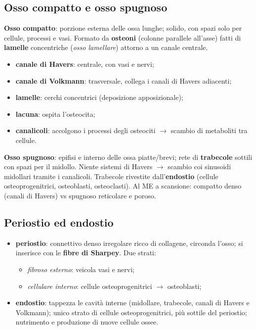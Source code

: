 \subsection{Osso compatto e osso spugnoso}
\textbf{Osso compatto}: porzione esterna delle ossa lunghe; solido, con spazi solo per cellule,
processi e vasi. Formato da \textbf{osteoni} (colonne parallele all'asse) fatti di \textbf{lamelle}
concentriche (\textit{osso lamellare}) attorno a un canale centrale.
\begin{itemize}
  \item \textbf{canale di Havers}: centrale, con vasi e nervi;
  \item \textbf{canale di Volkmann}: trasversale, collega i canali di Havers adiacenti;
  \item \textbf{lamelle}: cerchi concentrici (deposizione apposizionale);
  \item \textbf{lacuna}: ospita l'osteocita;
  \item \textbf{canalicoli}: accolgono i processi degli osteociti $\rightarrow$ scambio di
    metaboliti tra cellule.
\end{itemize}
\textbf{Osso spugnoso}: epifisi e interno delle ossa piatte/brevi; rete di \textbf{trabecole}
sottili con spazi per il midollo. Niente sistemi di Havers $\rightarrow$ scambio coi sinusoidi
midollari tramite i canalicoli. Trabecole rivestite dall'\textbf{endostio} (cellule
osteoprogenitrici, osteoblasti, osteoclasti). Al ME a scansione: compatto denso (canali di Havers)
vs spugnoso reticolare e poroso.

\subsection{Periostio ed endostio}
\begin{itemize}
  \item \textbf{periostio}: connettivo denso irregolare ricco di collagene, circonda l'osso; si
    inserisce con le \textbf{fibre di Sharpey}. Due strati:
    \begin{itemize}
      \item \textit{fibroso esterno}: veicola vasi e nervi;
      \item \textit{cellulare interno}: cellule osteoprogenitrici $\rightarrow$ osteoblasti;
    \end{itemize}
  \item \textbf{endostio}: tappezza le cavità interne (midollare, trabecole, canali di Havers e
    Volkmann); unico strato di cellule osteoprogenitrici, più sottile del periostio; nutrimento e
    produzione di nuove cellule ossee.
\end{itemize}

